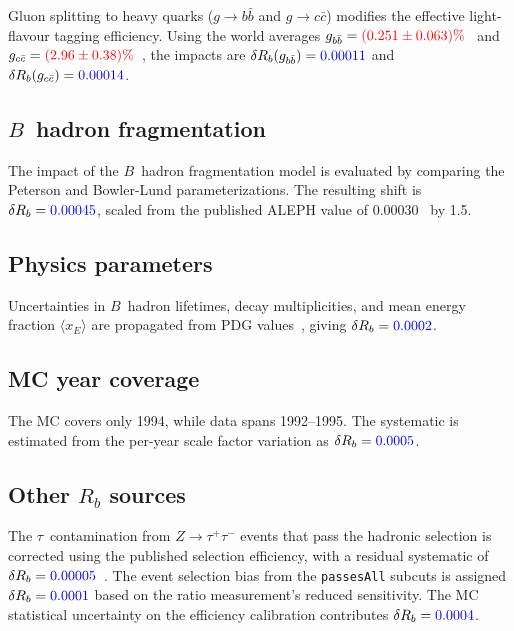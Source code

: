 \documentclass[11pt,a4paper]{article}
\newcommand{\measured}[1]{\textcolor{blue}{#1}}
\newcommand{\external}[1]{\textcolor{red}{#1}}
\begin{document}
Gluon splitting to heavy quarks ($g \to b\bar{b}$ and $g \to c\bar{c}$)
modifies the effective light-flavour tagging efficiency.  Using the world
averages $g_{b\bar{b}} = \external{(0.251 \pm 0.063)\%}$~\cite{ALEPH:gbb}
and $g_{c\bar{c}} = \external{(2.96 \pm 0.38)\%}$~\cite{LEP:gcc}, the
impacts are $\delta R_b(g_{b\bar{b}}) = \measured{0.00011}$ and
$\delta R_b(g_{c\bar{c}}) = \measured{0.00014}$.

\subsection{$B$~hadron fragmentation}
\label{sec:syst-frag}

The impact of the $B$~hadron fragmentation model is evaluated by comparing
the Peterson and Bowler-Lund parameterizations.  The resulting shift is
$\delta R_b = \measured{0.00045}$, scaled from the published ALEPH value
of $0.00030$~\cite{ALEPH:Rb:1996} by 1.5.

\subsection{Physics parameters}
\label{sec:syst-physparam}

Uncertainties in $B$~hadron lifetimes, decay multiplicities, and mean
energy fraction $\langle x_E \rangle$ are propagated from PDG
values~\cite{PDG:2024}, giving $\delta R_b = \measured{0.0002}$.

\subsection{MC year coverage}
\label{sec:syst-mc-year}

The MC covers only 1994, while data spans 1992--1995.  The systematic is
estimated from the per-year scale factor variation as
$\delta R_b = \measured{0.0005}$.

\subsection{Other $R_b$ sources}

The $\tau$~contamination from $Z \to \tau^+\tau^-$ events that pass the
hadronic selection is corrected using the published selection efficiency,
with a residual systematic of $\delta R_b = \measured{0.00005}$~\cite{ALEPH:sigma_had}.
The event selection bias from the \texttt{passesAll} subcuts is assigned
$\delta R_b = \measured{0.0001}$ based on the ratio measurement's
reduced sensitivity.  The MC statistical uncertainty on the efficiency
calibration contributes $\delta R_b = \measured{0.0004}$.
\end{document}
